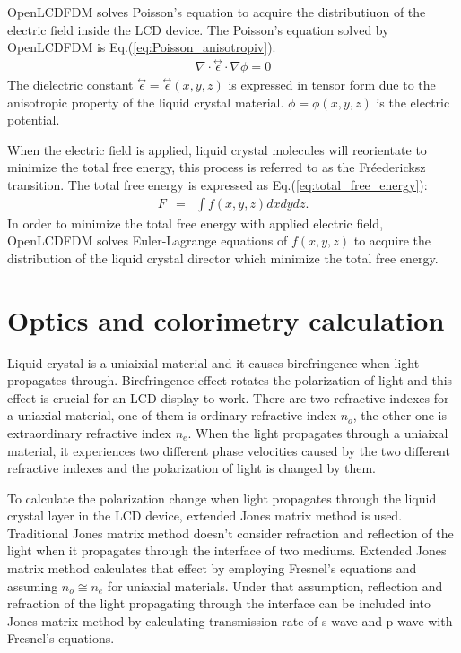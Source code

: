 \documentclass[11pt, a4paper]{article} %
\begin{document}
\begin{multicols}{2}
OpenLCDFDM solves Poisson's equation to acquire the distributiuon of the electric field inside the LCD device. The Poisson's equation solved by OpenLCDFDM is  Eq.(\ref{eq:Poisson_anisotropiv}).
\begin{eqnarray}
\nabla\cdot\stackrel{\leftrightarrow}{\epsilon}\cdot\nabla\phi = 0
\label{eq:Poisson_anisotropiv}
\end{eqnarray}
The dielectric constant $\stackrel{\leftrightarrow}{\epsilon} = \stackrel{\leftrightarrow}{\epsilon}(x,y,z)$ is expressed in tensor form due to the anisotropic property of the liquid crystal material. $\phi=\phi(x,y,z)$ is the electric potential.

When the electric field is applied, liquid crystal molecules will reorientate to minimize the total free energy, this process is referred to as the Fréedericksz transition.
The total free energy is expressed as Eq.(\ref{eq:total_free_energy}):
\begin{eqnarray}
F&=&\int f(x,y,z) dxdydz.
\label{eq:total_free_energy}
\end{eqnarray}
In order to minimize the total free energy with applied electric field, OpenLCDFDM solves Euler-Lagrange equations of $f(x,y,z)$ to acquire the distribution of the liquid crystal director which minimize the total free energy.

\section{Optics and colorimetry calculation}
Liquid crystal is a uniaixial material and it causes birefringence when light propagates through. Birefringence effect rotates the polarization of light and this effect is crucial for an LCD display to work. There are two refractive indexes for a uniaxial material, one of them is ordinary refractive index $n_o$, the other one is extraordinary refractive index $n_e$. When the light propagates through a uniaixal material, it experiences two different phase velocities caused by the two different refractive indexes and the polarization of light is changed by them.

To calculate the polarization change when light propagates through the liquid crystal layer in the LCD device, extended Jones matrix method\cite{POCHIYEH} is used.
Traditional Jones matrix method doesn't consider refraction and reflection of the light when it propagates through the interface of two mediums. Extended Jones matrix method calculates that effect by employing Fresnel's equations and assuming $n_o \cong n_e$ for uniaxial materials. Under that assumption, reflection and refraction of  the light propagating through the interface can be included into Jones matrix method by calculating transmission rate of s wave and p wave with Fresnel's equations.


\end{multicols}
\end{document}
